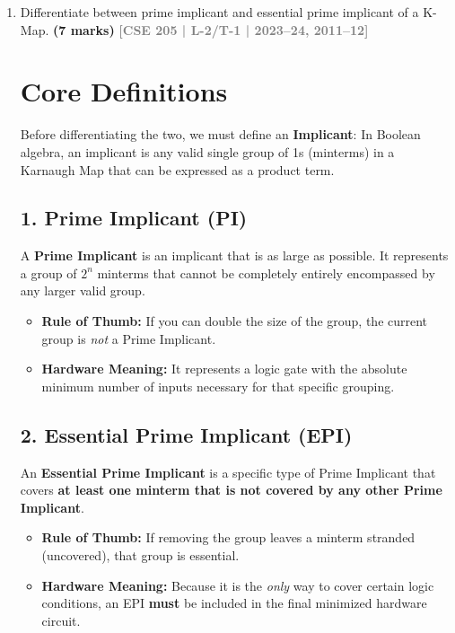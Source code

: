 \documentclass[12pt,a3paper]{article}
\newcommand{\yr}[1]{\hfill\textcolor{gray}{\small\textbf{[#1]}}}
\newcommand{\mk}[1]{\textcolor{orange!70!black}{\small\textbf{(#1 marks)}}}
\begin{document}
\begin{enumerate}


\item Differentiate between prime implicant and essential prime implicant of a K-Map.
\mk{7} \yr{CSE 205 | L-2/T-1 | 2023--24, 2011--12}

\begin{tcolorbox}[enhanced,breakable,ansbox,colback=cC!4,colframe=cC,boxrule=0.8pt,arc=5pt,title={\textbf{Answer}},fonttitle=\bfseries\color{white},colbacktitle=cC]

\section*{Core Definitions}

Before differentiating the two, we must define an \textbf{Implicant}: In Boolean algebra, an implicant is any valid single group of 1s (minterms) in a Karnaugh Map that can be expressed as a product term. 

\subsection*{1. Prime Implicant (PI)}
A \textbf{\textcolor{cC}{Prime Implicant}} is an implicant that is as large as possible. It represents a group of $2^n$ minterms that cannot be completely entirely encompassed by any larger valid group. 
\begin{itemize}
    \item \textbf{Rule of Thumb:} If you can double the size of the group, the current group is \textit{not} a Prime Implicant.
    \item \textbf{Hardware Meaning:} It represents a logic gate with the absolute minimum number of inputs necessary for that specific grouping.
\end{itemize}

\subsection*{2. Essential Prime Implicant (EPI)}
An \textbf{\textcolor{cC}{Essential Prime Implicant}} is a specific type of Prime Implicant that covers \textbf{at least one minterm that is not covered by any other Prime Implicant}.
\begin{itemize}
    \item \textbf{Rule of Thumb:} If removing the group leaves a minterm stranded (uncovered), that group is essential.
    \item \textbf{Hardware Meaning:} Because it is the \textit{only} way to cover certain logic conditions, an EPI \textbf{must} be included in the final minimized hardware circuit.
\end{itemize}


\end{tcolorbox}
\end{enumerate}
\end{document}

